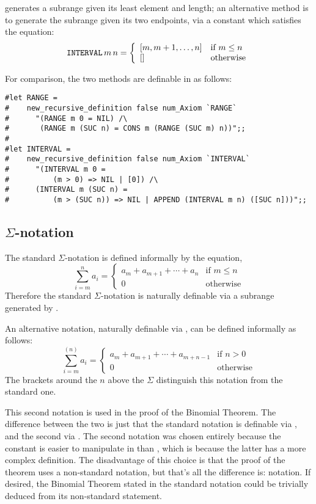 \verb@RANGE@ generates a subrange given its least element and length;
an alternative method is to generate the subrange given its two endpoints,
via a constant \verb@INTERVAL@ which satisfies the equation:
\[
\verb@INTERVAL@\,m\,n =
    \left\{\begin{array}{ll}
    [m, m+1, \ldots, n] & \mbox{if $m \leq n$} \\
    {}[] & \mbox{otherwise}
    \end{array}\right.
\]

For comparison, the two methods are definable in \HOL{} as follows:
\begin{session}
\begin{verbatim}
#let RANGE =
#    new_recursive_definition false num_Axiom `RANGE`
#      "(RANGE m 0 = NIL) /\
#       (RANGE m (SUC n) = CONS m (RANGE (SUC m) n))";;
#
#let INTERVAL =
#    new_recursive_definition false num_Axiom `INTERVAL`
#      "(INTERVAL m 0 =
#          (m > 0) => NIL | [0]) /\
#      (INTERVAL m (SUC n) =
#          (m > (SUC n)) => NIL | APPEND (INTERVAL m n) ([SUC n]))";;
\end{verbatim}
\end{session}

\subsection{$\Sigma$-notation}

The standard $\Sigma$-notation is defined informally by the equation,
\[
\sum_{i=m}^n a_i =
    \left\{\begin{array}{ll}
    a_m + a_{m+1} + \cdots + a_n & \mbox{if $m \leq n$} \\
    0 & \mbox{otherwise}
    \end{array}\right.
\]
Therefore the standard $\Sigma$-notation is naturally definable via
a subrange generated by \verb@INTERVAL@.

An alternative notation, naturally definable via \verb@RANGE@, can be
defined informally as follows:
\[
\sum_{i=m}^{(n)} a_i =
    \left\{\begin{array}{ll}
    a_m + a_{m+1} + \cdots + a_{m+n-1} & \mbox{if $n > 0$} \\
    0 & \mbox{otherwise}
    \end{array}\right.
\]
The brackets around the $n$ above the $\Sigma$ distinguish this
notation from the standard one.

This second notation is used in the \HOL{} proof of the Binomial Theorem.
The difference between the two is just that the standard notation is
definable via \verb@INTERVAL@, and the second via \verb@RANGE@. The second
notation was chosen entirely because the constant \verb@RANGE@ is easier
to manipulate in \HOL{} than \verb@INTERVAL@, which is because the latter
has a more complex definition. The disadvantage of this choice is that
the proof of the theorem uses a non-standard notation, but that's all the
difference is: notation.  If desired, the Binomial Theorem stated in the
standard notation could be trivially deduced from its non-standard statement.

